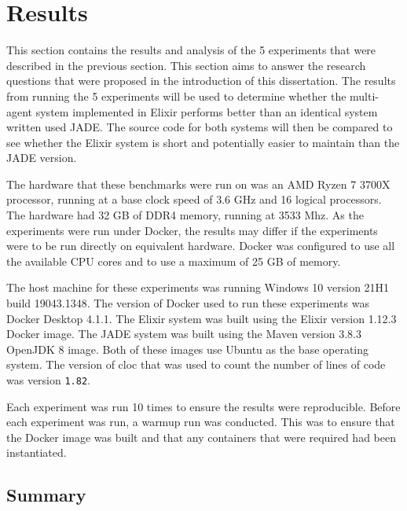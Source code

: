 \section{Results}

This section contains the results and analysis of the 5 experiments that were described in the previous section.
This section aims to answer the research questions that were proposed in the introduction of this dissertation.
The results from running the 5 experiments will be used to determine whether the multi-agent system implemented in Elixir performs better than an identical system written used JADE\@.
The source code for both systems will then be compared to see whether the Elixir system is short and potentially easier to maintain than the JADE version.

The hardware that these benchmarks were run on was an AMD Ryzen 7 3700X processor, running at a base clock speed of 3.6 GHz and 16 logical processors.
The hardware had 32 GB of DDR4 memory, running at 3533 Mhz.
As the experiments were run under Docker, the results may differ if the experiments were to be run directly on equivalent hardware.
Docker was configured to use all the available CPU cores and to use a maximum of 25 GB of memory.

The host machine for these experiments was running Windows 10 version 21H1 build 19043.1348.
The version of Docker used to run these experiments was Docker Desktop 4.1.1.
The Elixir system was built using the Elixir version 1.12.3 Docker image.
The JADE system was built using the Maven version 3.8.3 OpenJDK 8 image.
Both of these images use Ubuntu as the base operating system.
The version of cloc that was used to count the number of lines of code was version \verb|1.82|.

Each experiment was run 10 times to ensure the results were reproducible.
Before each experiment was run, a warmup run was conducted.
This was to ensure that the Docker image was built and that any containers that were required had been instantiated.









\subsection{Summary}

